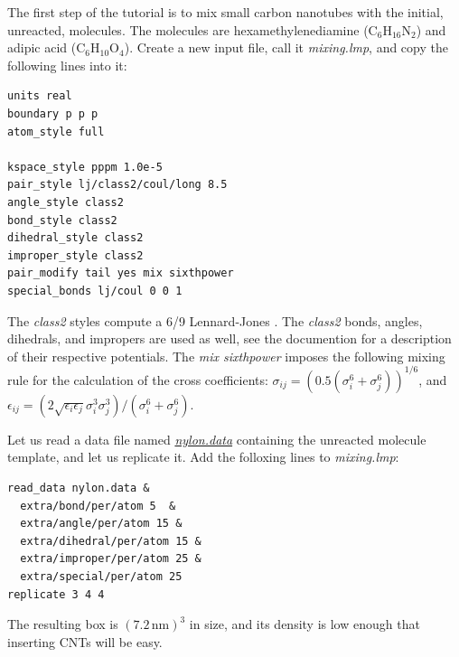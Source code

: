 \documentclass[9pt,tutorial]{livecoms}
\newcommand{\filepath}{https://raw.githubusercontent.com/lammpstutorials/lammpstutorials-article/main/files/}
\begin{document}
The first step of the tutorial is to mix small carbon nanotubes
with the initial, unreacted, molecules. The molecules are hexamethylenediamine
(C$_6$H$_{16}$N$_2$) and adipic acid (C$_6$H$_{10}$O$_4$). Create a new input
file, call it \textit{mixing.lmp}, and copy the following lines into it:
{\normalsize
\begin{verbatim}
units real
boundary p p p
atom_style full

kspace_style pppm 1.0e-5
pair_style lj/class2/coul/long 8.5
angle_style class2
bond_style class2
dihedral_style class2
improper_style class2
pair_modify tail yes mix sixthpower
special_bonds lj/coul 0 0 1
\end{verbatim}
}
The \textit{class2} styles compute a 6/9 Lennard-Jones \cite{sun1998compass}.
The \textit{class2} bonds, angles, dihedrals, and impropers are used as
well, see the documention for a description of their respective potentials.
The \textit{mix sixthpower} imposes the following mixing rule for the calculation
of the cross coefficients: $\sigma_{ij} = ( 0.5 (\sigma^6_i+\sigma_j^6))^{1/6}$,
and $\epsilon_{ij} = (2 \sqrt{\epsilon_i \epsilon_j} \sigma^3_i \sigma^3_j)
/ (\sigma^6_i+\sigma_j^6)$.

Let us read a data file named \href{\filepath tutorial8/nylon.data}{\textit{nylon.data}}
containing the unreacted molecule template, and let us replicate it. Add the
folloxing lines to \textit{mixing.lmp}:
{\normalsize
\begin{verbatim}
read_data nylon.data &
  extra/bond/per/atom 5  &
  extra/angle/per/atom 15 &
  extra/dihedral/per/atom 15 &
  extra/improper/per/atom 25 &
  extra/special/per/atom 25
replicate 3 4 4
\end{verbatim}
}
The resulting box is $(7.2\,\text{nm})^3$ in size, and its density is low
enough that inserting CNTs will be easy.
\end{document}
